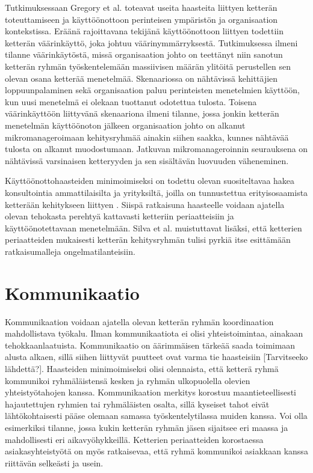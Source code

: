 Tutkimuksessaan Gregory et al. \cite{GREGORY201692} toteavat useita haasteita liittyen ketterän toteuttamiseen ja käyttöönottoon perinteisen ympäristön ja organisaation kontekstissa. Eräänä rajoittavana tekijänä käyttöönottoon liittyen todettiin ketterän väärinkäyttö, joka johtuu väärinymmärryksestä. Tutkimuksessa ilmeni tilanne väärinkäytöstä, missä organisaation johto on teettänyt niin sanotun ketterän ryhmän työskentelemään massiivisen määrän ylitöitä perustellen sen olevan osana ketterää menetelmää. Skenaariossa on nähtävissä kehittäjien loppuunpalaminen sekä organisaation paluu perinteisten menetelmien käyttöön, kun uusi menetelmä ei olekaan tuottanut odotettua tulosta. Toisena väärinkäyttöön liittyvänä skenaariona ilmeni tilanne, jossa jonkin ketterän menetelmän käyttöönoton jälkeen organisaation johto on alkanut mikromanageroimaan kehitysryhmää ainakin siihen saakka, kunnes nähtävää tulosta on alkanut muodostumaan. Jatkuvan mikromanageroinnin seurauksena on nähtävissä varsinaisen ketteryyden ja sen sisältävän luovuuden väheneminen.

Käyttöönottohaasteiden minimoimiseksi on todettu olevan suositeltavaa hakea konsultointia ammattilaisilta ja yrityksiltä, joilla on tunnustettua erityisosaamista ketterään kehitykseen liittyen \cite{SELLERISILVA201520}. Siispä ratkaisuna haasteelle voidaan ajatella olevan tehokasta perehtyä kattavasti ketteriin periaatteisiin ja käyttöönotettavaan menetelmään. Silva et al. muistuttavat lisäksi, että ketterien periaatteiden mukaisesti ketterän kehitysryhmän tulisi pyrkiä itse esittämään ratkaisumalleja ongelmatilanteisiin.

\section{Kommunikaatio}

Kommunikaation voidaan ajatella olevan ketterän ryhmän koordinaation mahdollistava työkalu. Ilman kommunikaatiota ei olisi yhteistoimintaa, ainakaan tehokkaanlaatuista. Kommunikaatio on äärimmäisen tärkeää saada toimimaan alusta alkaen, sillä siihen liittyvät puutteet ovat varma tie haasteisiin [Tarvitseeko lähdettä?]. Haasteiden minimoimiseksi olisi olennaista, että ketterä ryhmä kommunikoi ryhmäläistensä kesken ja ryhmän ulkopuolella olevien yhteistyötahojen kanssa. Kommunikaation merkitys korostuu maantieteellisesti hajautettujen ryhmien tai ryhmäläisten osalta, sillä kyseiset tahot eivät lähtökohtaisesti pääse olemaan samassa työskentelytilassa muiden kanssa. Voi olla esimerkiksi tilanne, jossa kukin ketterän ryhmän jäsen sijaitsee eri maassa ja mahdollisesti eri aikavyöhykkeillä. Ketterien periaatteiden korostaessa asiakasyhteistyötä on myös ratkaisevaa, että ryhmä kommunikoi asiakkaan kanssa riittävän selkeästi ja usein.

